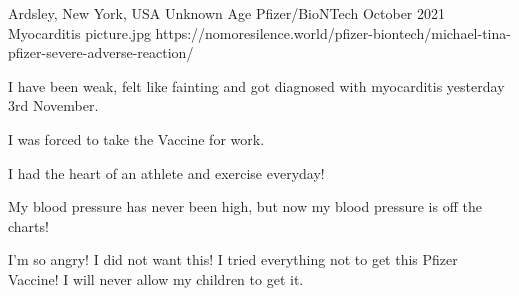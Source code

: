{Ardsley, New York, USA}
{Unknown Age}
{Pfizer/BioNTech}
{October 2021}
{Myocarditis}
{picture.jpg}
{https://nomoresilence.world/pfizer-biontech/michael-tina-pfizer-severe-adverse-reaction/}
{

I have been weak, felt like fainting and got diagnosed with myocarditis
yesterday 3rd November.

I was forced to take the Vaccine for work.

I had the heart of an athlete and exercise everyday!

My blood pressure has never been high, but now my blood pressure is off the
charts!

I’m so angry! I did not want this! I tried everything not to get this Pfizer
Vaccine! I will never allow my children to get it.

}
